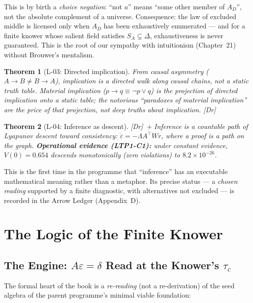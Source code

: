 \documentclass[11pt,a4paper,twoside]{book}
\newcommand{\tier}[1]{\textnormal{\small\textsf{[#1]}}}
\newcommand{\Dr}{\tier{Dr}}\newcommand{\Cj}{\tier{Cj}}\newcommand{\Wf}{\tier{Wf}}
\theoremstyle{plain}
\newtheorem{theorem}{Theorem}[chapter]
\theoremstyle{definition}
\theoremstyle{remark}
\begin{document}
This is by birth a \emph{choice negation}: ``not $a$'' means ``some other
member of $A_D$'', not the absolute complement of a universe. Consequence:
the law of excluded middle is licensed only when $A_D$ has been exhaustively
enumerated --- and for a finite knower whose salient field satisfies
$S_A \subsetneq \Delta$, exhaustiveness is never guaranteed. This is the root
of our sympathy with intuitionism (Chapter~21) without Brouwer's mentalism.

\begin{theorem}[L-03: Directed implication]\Th
From causal asymmetry ($A{\to}B \neq B{\to}A$), implication is a
\emph{directed walk along causal chains}, not a static truth table. Material
implication ($p\to q \equiv \neg p \lor q$) is the projection of directed
implication onto a static table; the notorious ``paradoxes of material
implication'' are the price of that projection, not deep truths about
implication. \Dr
\end{theorem}

\begin{theorem}[L-04: Inference as descent]\Dr\ + \fd\label{th:descent}
Inference is a countable path of Lyapunov descent toward consistency:
$\dot\varepsilon = -\Lambda A^{\!\top} W r$, where a proof is a path on the
graph. \textbf{Operational evidence (LTP1-C1):} under constant evidence,
$V(0)=0.654$ descends monotonically (zero violations) to $8.2\times10^{-26}$.
\end{theorem}

This is the first time in the programme that ``inference'' has an executable
mathematical meaning rather than a metaphor. Its precise status --- a
\emph{chosen reading} supported by a finite diagnostic, with alternatives not
excluded --- is recorded in the Arrow Ledger (Appendix~D).

\part{The Logic of the Finite Knower}

\chapter{The Engine: $A\varepsilon=\delta$ Read at the Knower's $\tau_c$}

The formal heart of the book is a \emph{re-reading} (not a re-derivation) of
the seed algebra of the parent programme's minimal viable foundation:
\end{document}
